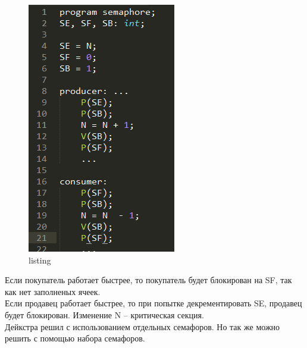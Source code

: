 \begin{figure}[H]
    \centering
    \includegraphics[width=\textwidth]{listing/2.png}
    \caption{listing}
\end{figure}

Если покупатель работает быстрее, то покупатель будет блокирован на SF, так как нет заполненых ячеек.\\
Если продавец работает быстрее, то при попытке декрементировать SE, продавец будет блокирован.  Изменение N – критическая секция. \\
Дейкстра решил с использованием отдельных семафоров. Но так же можно решить с помощью набора семафоров.

